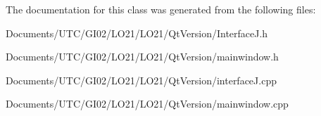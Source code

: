 The documentation for this class was generated from the following files\+:\begin{DoxyCompactItemize}
\item 
Documents/\+U\+T\+C/\+G\+I02/\+L\+O21/\+L\+O21/\+Qt\+Version/Interface\+J.\+h\item 
Documents/\+U\+T\+C/\+G\+I02/\+L\+O21/\+L\+O21/\+Qt\+Version/mainwindow.\+h\item 
Documents/\+U\+T\+C/\+G\+I02/\+L\+O21/\+L\+O21/\+Qt\+Version/interface\+J.\+cpp\item 
Documents/\+U\+T\+C/\+G\+I02/\+L\+O21/\+L\+O21/\+Qt\+Version/mainwindow.\+cpp\end{DoxyCompactItemize}
